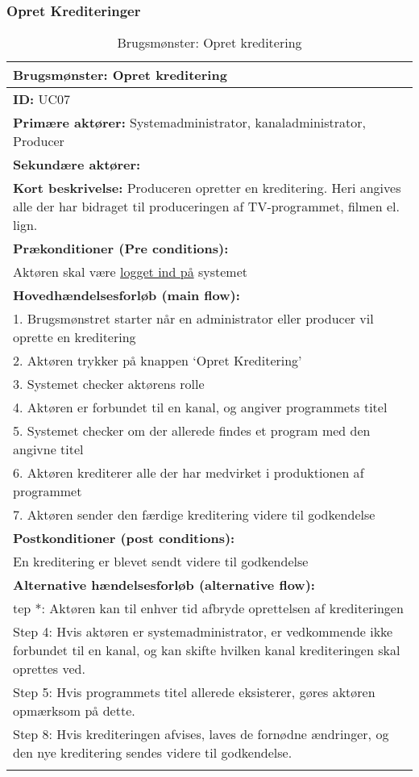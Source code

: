  \subsubsection{Opret Krediteringer}
\begin{longtable}[h] {|p{16cm}|}
 \hline
       \textbf{Brugsmønster:} Opret kreditering \\
    \hline
	\textbf{ID:} UC07 \\ \hline
	\textbf{Primære aktører:} Systemadministrator, kanaladministrator, Producer \\ \hline
	\textbf{Sekundære aktører:} \\ \hline
 	\textbf{Kort beskrivelse:} Produceren opretter en kreditering. Heri angives alle der har bidraget til produceringen af TV-programmet, filmen el. lign. \\ \hline
	\textbf{Prækonditioner (Pre conditions):} \\
 Aktøren skal være \hyperref[table:login]{logget ind på} systemet \\ \hline
 \textbf{Hovedhændelsesforløb (main flow):} \\
	1. Brugsmønstret starter når en administrator eller producer vil oprette en kreditering \\
	2. Aktøren trykker på knappen ‘Opret Kreditering’ \\
	3. Systemet checker aktørens rolle \\
	4. Aktøren er forbundet til en kanal, og angiver programmets titel \\
	5. Systemet checker om der allerede findes et program med den angivne titel \\ 
	6. Aktøren krediterer alle der har medvirket i produktionen af programmet \\ 
	7. Aktøren sender den færdige kreditering videre til godkendelse \\ \hline
\textbf{Postkonditioner (post conditions):} \\ 
	En kreditering er blevet sendt videre til godkendelse \\ \hline
	\textbf{Alternative hændelsesforløb (alternative flow):} \\
tep *: Aktøren kan til enhver tid afbryde oprettelsen af krediteringen \\
Step 4: Hvis aktøren er systemadministrator, er vedkommende ikke forbundet til en kanal, og kan skifte hvilken kanal krediteringen skal oprettes ved. \\

Step 5: Hvis programmets titel allerede eksisterer, gøres aktøren opmærksom på dette. \\

Step 8: Hvis krediteringen afvises, laves de fornødne ændringer, og den nye kreditering sendes videre til godkendelse. \\
\hline
\caption{Brugsmønster: Opret kreditering}
\label{tab:create_credits}
\end{longtable}


